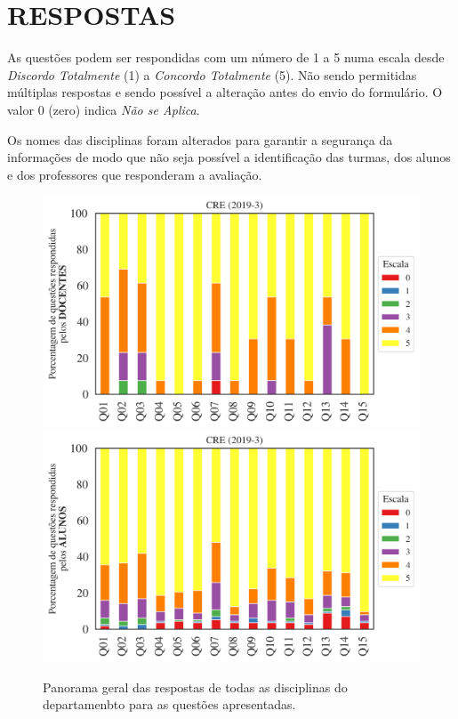 \documentclass[a4paper,10pt]{article}
\begin{document}
\section{RESPOSTAS}
As questões podem ser respondidas com um número de 1 a 5 numa escala desde {\it Discordo Totalmente} (1) a {\it Concordo Totalmente} (5). Não sendo permitidas múltiplas respostas e sendo possível a alteração antes do envio do formulário. O valor 0 (zero) indica {\it Não se Aplica}.

Os nomes das disciplinas foram alterados para garantir a segurança da informações de modo que não seja possível a identificação das turmas, dos alunos  e dos professores que responderam a avaliação.

\begin{figure}[h]
\centering
\includegraphics[width=0.85\linewidth]{analise_geral_departamento_CRE_docentes.png}
\includegraphics[width=0.85\linewidth]{analise_geral_departamento_CRE_alunos.png}
\caption{\label{fig:analise_geral_departamento}            Panorama geral das respostas de todas as  disciplinas do departamenbto para as questões apresentadas.}
\end{figure}
\end{document}
